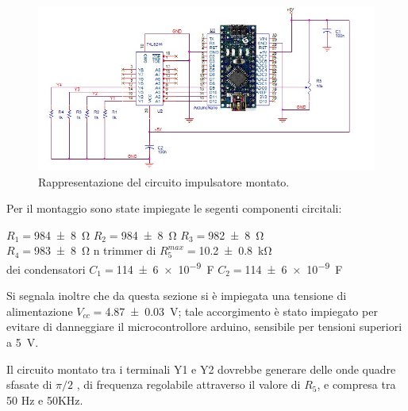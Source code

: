 		\begin{figure}[htb]
			\includegraphics[scale=0.50]{../Figs-Tabs/imp.png}
			\caption{Rappresentazione del circuito impulsatore montato.}
			\label{f:impulsatore}
		\end{figure}
	Per il montaggio sono state impiegate le  segenti componenti circitali:
	\begin{center}
	\bigskip
		$R_{1}=$\SI{984 \pm 8}{\ohm} $R_{2}=$\SI{984 \pm 8}{\ohm} $R_{3}=$\SI{982 \pm 8}{\ohm} \\
		$R_{4}=$\SI{983 \pm 8}{\ohm} n trimmer di $R_{5}^{max}=$\SI{10.2 \pm 0.8}{\kilo \ohm} \\
 		dei condensatori	$C_{1}=$\SI{114 \pm 6 e-9}{\farad} $C_{2}=$\SI{114  \pm 6 e-9}{\farad}
	
	\end{center}
	Si segnala inoltre 
	che da questa sezione si è impiegata una tensione di alimentazione $V_{cc}=$\SI{4.87 \pm 0.03}{\volt}; tale accorgimento è stato impiegato per evitare di danneggiare il microcontrollore arduino, sensibile per tensioni superiori a \SI{5}{\volt}.

	Il circuito montato tra i terminali Y1 e Y2 dovrebbe generare delle onde quadre sfasate di $\pi/2$ , di frequenza regolabile attraverso il valore di $R_{5}$, e  compresa tra 50 Hz e 50KHz.
	
